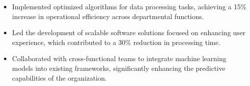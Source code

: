 \documentclass{minimal}
\begin{document}
\begin{adjustwidth}{2em}{0em}
\begin{itemize}
\end{itemize}
\vspace{0.5em}
\begin{flushleft}{}\end{flushleft}
\begin{itemize}
    \item Implemented optimized algorithms for data processing tasks, achieving a 15\% increase in operational efficiency across departmental functions.
\end{itemize}
\begin{itemize}
    \item Led the development of scalable software solutions focused on enhancing user experience, which contributed to a 30\% reduction in processing time.
\end{itemize}
\begin{itemize}
    \item Collaborated with cross{-}functional teams to integrate machine learning models into existing frameworks, significantly enhancing the predictive capabilities of the organization.
\end{itemize}
\vspace{0.5em}
\end{adjustwidth}

\begin{adjustwidth}{2em}{0em}
\end{adjustwidth}

\vspace{1em}

\end{document}
